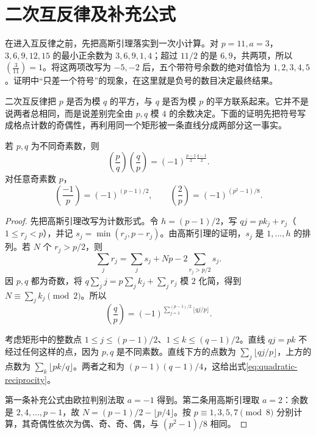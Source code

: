 \documentclass[UTF8,12pt,a4paper,fontset=fandol]{ctexbook}
\begin{document}
\section{二次互反律及补充公式}

在进入互反律之前，先把高斯引理落实到一次小计算。对 $p=11,a=3$，$3,6,9,12,15$ 的最小正余数为 $3,6,9,1,4$；超过 $11/2$ 的是 $6,9$，共两项，所以 $\left(\frac3{11}\right)=1$。将这两项改写为 $-5,-2$ 后，五个带符号余数的绝对值恰为 $1,2,3,4,5$。证明中“只差一个符号”的现象，在这里就是负号的数目决定最终结果。

二次互反律把 $p$ 是否为模 $q$ 的平方，与 $q$ 是否为模 $p$ 的平方联系起来。它并不是说两者总相同，而是说差别完全由 $p,q$ 模 $4$ 的余数决定。下面的证明先把符号写成格点计数的奇偶性，再利用同一个矩形被一条直线分成两部分这一事实。

\begin{theorem}[二次互反律]
\label{thm:quadratic-reciprocity}
若 $p,q$ 为不同奇素数，则
\begin{equation}
 \left(\frac pq\right)\left(\frac qp\right)
 =(-1)^{\frac{p-1}{2}\frac{q-1}{2}}.
 \label{eq:quadratic-reciprocity}
\end{equation}
对任意奇素数 $p$，
\begin{equation}
 \left(\frac{-1}{p}\right)=(-1)^{(p-1)/2},\qquad
 \left(\frac2p\right)=(-1)^{(p^2-1)/8}.
 \label{eq:quadratic-supplements}
\end{equation}
\end{theorem}
\begin{proof}
先把高斯引理改写为计数形式。令 $h=(p-1)/2$，写 $qj=pk_j+r_j$（$1\le r_j<p$），并记 $s_j=\min(r_j,p-r_j)$。由高斯引理的证明，$s_j$ 是 $1,\ldots,h$ 的排列。若 $N$ 个 $r_j>p/2$，则
\[
 \sum_jr_j=\sum_js_j+Np-2\sum_{r_j>p/2}s_j.
\]
因 $p,q$ 都为奇数，将 $q\sum_jj=p\sum_jk_j+\sum_jr_j$ 模 $2$ 化简，得到 $N\equiv\sum_jk_j\pmod2$。所以
\[
 \left(\frac qp\right)=(-1)^{\sum_{j=1}^{(p-1)/2}\lfloor qj/p\rfloor}.
\]

考虑矩形中的整数点 $1\le j\le(p-1)/2$、$1\le k\le(q-1)/2$。直线 $qj=pk$ 不经过任何这样的点，因为 $p,q$ 是不同素数。直线下方的点数为 $\sum_j\lfloor qj/p\rfloor$，上方的点数为 $\sum_k\lfloor pk/q\rfloor$。两者之和为 $(p-1)(q-1)/4$，这给出式\eqref{eq:quadratic-reciprocity}。

第一条补充公式由欧拉判别法取 $a=-1$ 得到。第二条用高斯引理取 $a=2$：余数是 $2,4,\ldots,p-1$，故 $N=(p-1)/2-\lfloor p/4\rfloor$。按 $p\equiv1,3,5,7\pmod8$ 分别计算，其奇偶性依次为偶、奇、奇、偶，与 $(p^2-1)/8$ 相同。
\end{proof}
\end{document}
